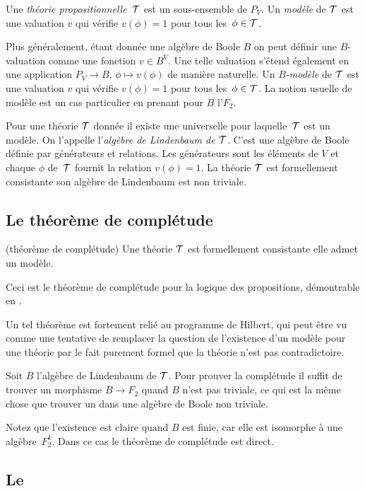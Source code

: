 Une {\em théorie propositionnelle}~${\cal T}$ est un sous-ensemble de $P_V$.
Un {\em modèle} de ${\cal T}$ est une  valuation $v$ qui vérifie $v(\phi)=1$
pour tous \hbox{les $\phi\in {\cal T}$}.

Plus généralement, étant donnée une algèbre de Boole $B$ on peut définir
une $B$-valuation comme une fonction $v\in B^V$. Une telle valuation s'étend 
également en une application
$P_V\rightarrow B$, $\phi\longmapsto v(\phi)$ de manière naturelle.  
Un {\em $B$-modèle} de ${\cal T}$ est une  valuation $v$ qui vérifie $v(\phi)=1$
pour tous \hbox{les $\phi\in {\cal T}$}. La notion usuelle de modèle est un cas particulier en prenant pour $B$ l'\alg $F_2$.

Pour une théorie ${\cal T}$ donnée il existe  une \agB 
universelle pour laquelle~${\cal T}$ est un modèle. On l'appelle l'\emph{algèbre de Lindenbaum de ${\cal T}$}. C'est une algèbre de Boole définie par générateurs et relations. Les générateurs sont les éléments de $V$ et chaque \elt $\phi$ de~${\cal T}$ fournit la relation $v(\phi)=1$. La théorie ${\cal T}$ est formellement consistante \ssi son algèbre de Lindenbaum est non triviale. 

\subsection{Le théorème de complétude}

\begin{theorem}
(théorème de complétude) Une théorie ${\cal T}$ est formellement consistante \ssi elle admet un modèle.
\end{theorem}

Ceci est le théorème de complétude pour la logique des propositions, démontrable en \clama.

Un tel théorème est fortement relié au programme de Hilbert, qui peut être vu comme une tentative de remplacer la question de  l'existence d'un modèle 
pour une théorie par le fait purement formel que la théorie n'est pas 
contradictoire. 


Soit $B$ l'algèbre de Lindenbaum de ${\cal T}$. Pour prouver la complétude
il suffit de trouver un morphisme $B\rightarrow F_2$ quand $B$ n'est pas
triviale, ce qui est la même chose que trouver un \idep dans une algèbre de Boole non triviale.

Notez que l'existence est claire quand $B$ est finie, car elle est isomorphe à une algèbre~$F_2^k$. Dans ce cas le théorème de complétude est direct.


\subsection{Le \tcg}

